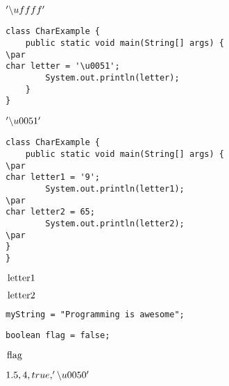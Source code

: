 \documentclass{book}
\def\lthtmlcheckvsize{\ifdim\ht\sizebox<\vsize 
  \ifdim\wd\sizebox<\hsize\expandafter\hfill\fi \expandafter\vfill
  \else\expandafter\vss\fi}%
\begin{document}
{\newpage\clearpage
{}%
$'\symbol{92}uffff'$%
\lthtmlindisplaymathZ
\lthtmlcheckvsize\clearpage}

{\newpage\clearpage
{}%
\begin{lstlisting}
class CharExample {
    public static void main(String[] args) {
\par
char letter = '\u0051';
        System.out.println(letter);
    }
}
\end{lstlisting}%
\lthtmlfigureZ
\lthtmlcheckvsize\clearpage}

{\newpage\clearpage
{}%
$'\symbol{92}u0051'$%
\lthtmlindisplaymathZ
\lthtmlcheckvsize\clearpage}

{\newpage\clearpage
{}%
\begin{lstlisting}
class CharExample {
    public static void main(String[] args) {
\par
char letter1 = '9';
        System.out.println(letter1);
\par
char letter2 = 65;
        System.out.println(letter2);
\par
}
}
\end{lstlisting}%
\lthtmlfigureZ
\lthtmlcheckvsize\clearpage}

{\newpage\clearpage
{}%
$\lstinline{letter1}$%
\lthtmlindisplaymathZ
\lthtmlcheckvsize\clearpage}

{\newpage\clearpage
{}%
$\lstinline{letter2}$%
\lthtmlindisplaymathZ
\lthtmlcheckvsize\clearpage}

{\newpage\clearpage
{}%
\begin{lstlisting}
myString = "Programming is awesome";
\end{lstlisting}%
\lthtmlfigureZ
\lthtmlcheckvsize\clearpage}

{\newpage\clearpage
{}%
\begin{lstlisting}
boolean flag = false;
\end{lstlisting}%
\lthtmlfigureZ
\lthtmlcheckvsize\clearpage}

{\newpage\clearpage
{}%
$\lstinline{flag}$%
\lthtmlindisplaymathZ
\lthtmlcheckvsize\clearpage}

{\newpage\clearpage
{}%
$1.5, 4, true, '\symbol{92}u0050'$%
\lthtmlindisplaymathZ
\lthtmlcheckvsize\clearpage}
\end{document}
